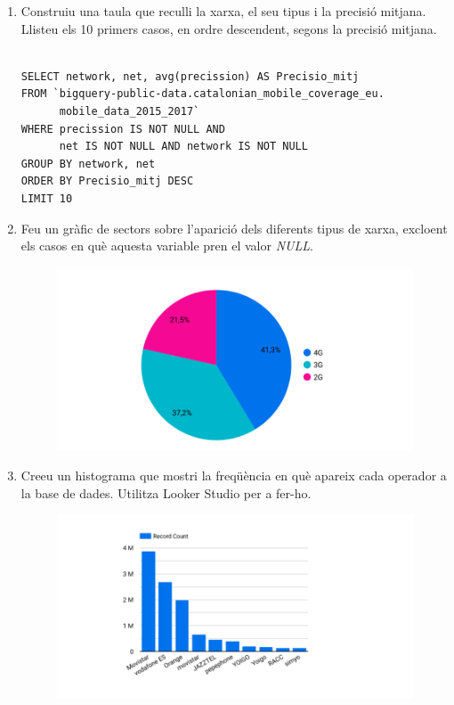 \documentclass[12pt,longbibliography]{article}
\theoremstyle{definition}
\theoremstyle{remark}
\begin{document}
\begin{enumerate}
\item Construiu una taula que reculli la xarxa, el seu tipus i la precisió mitjana. Llisteu els 10 primers casos, en ordre descendent, segons la precisió mitjana.

\begin{Verbatim}[frame=single]

SELECT network, net, avg(precission) AS Precisio_mitj
FROM `bigquery-public-data.catalonian_mobile_coverage_eu.
      mobile_data_2015_2017`
WHERE precission IS NOT NULL AND 
      net IS NOT NULL AND network IS NOT NULL
GROUP BY network, net
ORDER BY Precisio_mitj DESC
LIMIT 10
\end{Verbatim}

\item Feu un gràfic de sectors sobre l'aparició dels diferents tipus de xarxa, excloent els casos en què aquesta variable pren el valor \textit{NULL}.

\vspace{2mm}
\begin{figure}[H]
\begin{center}
\includegraphics[width=12.5cm]{pbq1}
\end{center}
\label{fig:pbq1}
\end{figure}

\item Creeu un histograma que mostri la freqüència en què apareix cada operador a la base de dades. Utilitza Looker Studio per a fer-ho.

\vspace{2mm}
\begin{figure}[H]
\begin{center}
\includegraphics[width=12.5cm]{pbq2}
\end{center}
\label{fig:pbq2}
\end{figure}

\end{enumerate}
\end{document}
